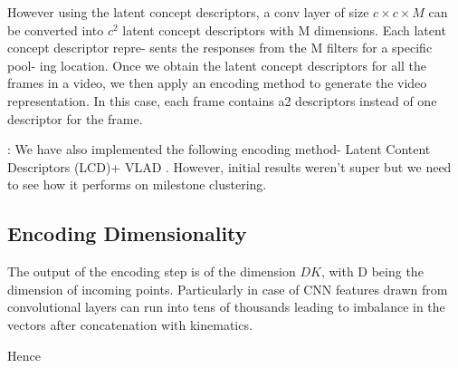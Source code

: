 However using the latent concept descriptors, a conv layer of size $c\times c \times M$ can be converted into $c^2$ latent concept descriptors with M dimensions. Each latent concept descriptor repre- sents the responses from the M filters for a specific pool- ing location. Once we obtain the latent concept descriptors for all the frames in a video, we then apply an encoding method to generate the video representation. In this case, each frame contains a2 descriptors instead of one descriptor for the frame.

: We have also implemented the following encoding method- Latent Content Descriptors (LCD)+ VLAD \cite{xu2014discriminative}. However, initial results weren't super but we need to see how it performs on milestone clustering.

\subsection{Encoding Dimensionality}
The output of the encoding step is of the dimension $DK$, with D being the dimension of incoming points. Particularly in case of CNN features drawn from convolutional layers can run into tens of thousands leading to imbalance in the vectors after concatenation with kinematics. 

Hence 


